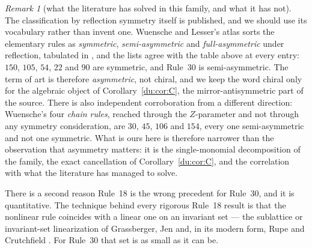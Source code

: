 \documentclass[11pt]{article}
\theoremstyle{definition}
\theoremstyle{remark}
\newtheorem{remark}[theorem]{Remark}
\begin{document}
\begin{remark}[what the literature has solved in this family, and what it has not]
The classification by reflection symmetry itself is published, and we should use its vocabulary rather
than invent one. Wuensche and Lesser's atlas sorts the elementary rules as \emph{symmetric},
\emph{semi-asymmetric} and \emph{full-asymmetric} under reflection, tabulated in
\cite[\S4.3]{Martinez}, and the lists agree with the table above at every entry: $150$, $105$, $54$,
$22$ and $90$ are symmetric, and Rule~30 is semi-asymmetric. The term of art is therefore
\emph{asymmetric}, not chiral, and we keep the word chiral only for the algebraic object of
Corollary~\ref{du:cor:C}, the mirror-antisymmetric part of the source. There is also independent
corroboration from a different direction: Wuensche's four \emph{chain rules}, reached through the
$Z$-parameter and not through any symmetry consideration, are $30$, $45$, $106$ and $154$, every one
semi-asymmetric and not one symmetric. What is ours here is therefore narrower than the observation
that asymmetry matters: it is the single-monomial decomposition of the family, the exact cancellation
of Corollary~\ref{du:cor:C}, and the correlation with what the literature has managed to solve.
\end{remark}

There is a second reason Rule~18 is the wrong precedent for Rule~30, and it is quantitative. The
technique behind every rigorous Rule~18 result is that the nonlinear rule coincides with a linear one
on an invariant set --- the sublattice or invariant-set linearization of Grassberger, Jen and, in its
modern form, Rupe and Crutchfield \cite{RC}. For Rule~30 that set is as small as it can be.
\end{document}
